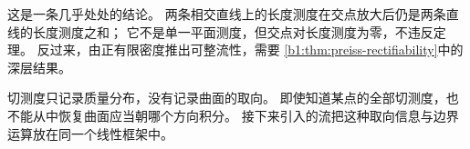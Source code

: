 这是一条几乎处处的结论。
两条相交直线上的长度测度在交点放大后仍是两条直线的长度测度之和；
它不是单一平面测度，但交点对长度测度为零，不违反定理。
反过来，由正有限密度推出可整流性，需要%
\cref{b1:thm:preiss-rectifiability}中的深层结果。


\ProseParagraphBreak

切测度只记录质量分布，没有记录曲面的取向。
即使知道某点的全部切测度，也不能从中恢复曲面应当朝哪个方向积分。
接下来引入的流把这种取向信息与边界运算放在同一个线性框架中。
